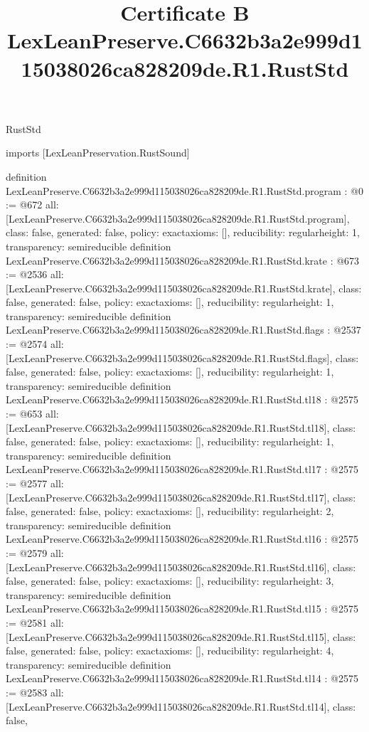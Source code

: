 \begin{lexlean}{RustStd}
\title{Certificate B LexLeanPreserve.C6632b3a2e999d115038026ca828209de.R1.RustStd}
\begin{coremodule}
imports [LexLeanPreservation.RustSound]

definition LexLeanPreserve.C6632b3a2e999d115038026ca828209de.R1.RustStd.program : @0 := @672 {
  all: [LexLeanPreserve.C6632b3a2e999d115038026ca828209de.R1.RustStd.program],
  class: false,
  generated: false,
  policy: exact{axioms: []},
  reducibility: regular{height: 1},
  transparency: semireducible
}
definition LexLeanPreserve.C6632b3a2e999d115038026ca828209de.R1.RustStd.krate : @673 := @2536 {
  all: [LexLeanPreserve.C6632b3a2e999d115038026ca828209de.R1.RustStd.krate],
  class: false,
  generated: false,
  policy: exact{axioms: []},
  reducibility: regular{height: 1},
  transparency: semireducible
}
definition LexLeanPreserve.C6632b3a2e999d115038026ca828209de.R1.RustStd.flags : @2537 := @2574 {
  all: [LexLeanPreserve.C6632b3a2e999d115038026ca828209de.R1.RustStd.flags],
  class: false,
  generated: false,
  policy: exact{axioms: []},
  reducibility: regular{height: 1},
  transparency: semireducible
}
definition LexLeanPreserve.C6632b3a2e999d115038026ca828209de.R1.RustStd.tl18 : @2575 := @653 {
  all: [LexLeanPreserve.C6632b3a2e999d115038026ca828209de.R1.RustStd.tl18],
  class: false,
  generated: false,
  policy: exact{axioms: []},
  reducibility: regular{height: 1},
  transparency: semireducible
}
definition LexLeanPreserve.C6632b3a2e999d115038026ca828209de.R1.RustStd.tl17 : @2575 := @2577 {
  all: [LexLeanPreserve.C6632b3a2e999d115038026ca828209de.R1.RustStd.tl17],
  class: false,
  generated: false,
  policy: exact{axioms: []},
  reducibility: regular{height: 2},
  transparency: semireducible
}
definition LexLeanPreserve.C6632b3a2e999d115038026ca828209de.R1.RustStd.tl16 : @2575 := @2579 {
  all: [LexLeanPreserve.C6632b3a2e999d115038026ca828209de.R1.RustStd.tl16],
  class: false,
  generated: false,
  policy: exact{axioms: []},
  reducibility: regular{height: 3},
  transparency: semireducible
}
definition LexLeanPreserve.C6632b3a2e999d115038026ca828209de.R1.RustStd.tl15 : @2575 := @2581 {
  all: [LexLeanPreserve.C6632b3a2e999d115038026ca828209de.R1.RustStd.tl15],
  class: false,
  generated: false,
  policy: exact{axioms: []},
  reducibility: regular{height: 4},
  transparency: semireducible
}
definition LexLeanPreserve.C6632b3a2e999d115038026ca828209de.R1.RustStd.tl14 : @2575 := @2583 {
  all: [LexLeanPreserve.C6632b3a2e999d115038026ca828209de.R1.RustStd.tl14],
  class: false,
}
\end{coremodule}
\end{lexlean}
